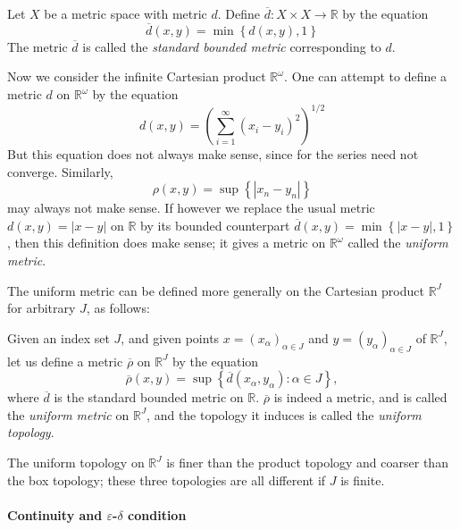 \begin{theorem}
  Let \( X \) be a metric space with metric \( d \).
  Define \( \overline{d}: X \times X \to \mathbb{R} \) by the equation
  \[
    \overline{d}(x, y) = \min \left\lbrace d(x, y), 1 \right\rbrace
  \]
  The metric \( \overline{d} \) is called the \emph{standard bounded metric} corresponding to \( d \).
\end{theorem}

Now we consider the infinite Cartesian product \( \mathbb{R}^\omega \).
One can attempt to define a metric \( d \) on \( \mathbb{R}^\omega \) by the equation
\[
  d(x, y) = \left(\sum_{i = 1}^\infty(x_i - y_i)^2\right)^{1/2}
\]
But this equation does not always make sense, since for the series need not converge.
Similarly,
\[
  \rho(x, y) = \sup \left\lbrace \left\vert x_n - y_n \right\vert \right\rbrace
\]
may always not make sense.
  If however we replace the usual metric \( d(x, y) = \left\vert x - y \right\vert \) on \( \mathbb{R} \) by its bounded counterpart \( \overline{d}(x, y) = \min \left\lbrace \left\vert x - y \right\vert, 1 \right\rbrace \), then this definition does make sense; it gives a metric on \( \mathbb{R}^\omega \) called the \emph{uniform metric}.

The uniform metric can be defined more generally on the Cartesian product \( \mathbb{R}^J \) for arbitrary \( J \), as follows:
\begin{definition}
  Given an index set \( J \), and given points \( x = (x_\alpha)_{\alpha \in J} \) and \( y = (y_\alpha)_{\alpha \in J} \) of \( \mathbb{R}^J \), let us define a metric \( \overline{\rho} \) on \( \mathbb{R}^J \) by the equation
  \[
    \overline{\rho}(x, y) = \sup \left\lbrace \overline{d}(x_\alpha, y_\alpha): \alpha \in J \right\rbrace,
  \]
  where \( \overline{d} \) is the standard bounded metric on \( \mathbb{R} \).
  \( \overline{\rho} \) is indeed a metric, and is called the \emph{uniform metric} on \( \mathbb{R}^J \), and the topology it induces is called the \emph{uniform topology}.
\end{definition}

\begin{theorem}
  The uniform topology on \( \mathbb{R}^J \) is finer than the product topology and coarser than the box topology;
  these three topologies are all different if \( J \) is finite.
\end{theorem}

\paragraph{Continuity and \( \varepsilon \)-\( \delta \) condition}

